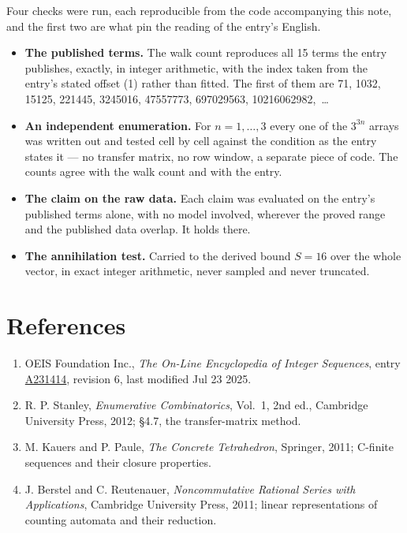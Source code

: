 \documentclass[11pt]{article}
\theoremstyle{definition}
\begin{document}
Four checks were run, each reproducible from the code accompanying this note, and the first two are what pin the reading of the entry's English.

\begin{itemize}

\item {\bfseries The published terms.} The walk count reproduces all 15 terms the entry publishes, exactly, in integer arithmetic, with the index taken from the entry's stated offset (1) rather than fitted. The first of them are 71, 1032, 15125, 221445, 3245016, 47557773, 697029563, 10216062982,~\dots

\item {\bfseries An independent enumeration.} For $n = 1,\dots,3$ every one of the $3^{3n}$ arrays was written out and tested cell by cell against the condition as the entry states it --- no transfer matrix, no row window, a separate piece of code. The counts agree with the walk count and with the entry.

\item {\bfseries The claim on the raw data.} Each claim was evaluated on the entry's published terms alone, with no model involved, wherever the proved range and the published data overlap. It holds there.

\item {\bfseries The annihilation test.} Carried to the derived bound $S = 16$ over the whole vector, in exact integer arithmetic, never sampled and never truncated.

\end{itemize}

\section{References}

\begin{enumerate}

\item OEIS Foundation Inc., \emph{The On-Line Encyclopedia of Integer Sequences}, entry \href{https://oeis.org/A231414}{A231414}, revision 6, last modified Jul 23 2025.

\item R. P. Stanley, \emph{Enumerative Combinatorics}, Vol.~1, 2nd ed., Cambridge University Press, 2012; \S4.7, the transfer-matrix method.

\item M. Kauers and P. Paule, \emph{The Concrete Tetrahedron}, Springer, 2011; C-finite sequences and their closure properties.

\item J. Berstel and C. Reutenauer, \emph{Noncommutative Rational Series with Applications}, Cambridge University Press, 2011; linear representations of counting automata and their reduction.

\end{enumerate}
\end{document}
